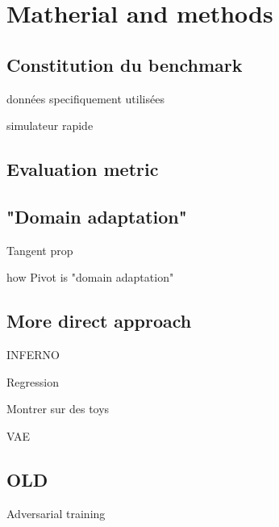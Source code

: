 
\chapter{Matherial and methods}
\label{chap:matherial_methods}
\ifpdf
    \graphicspath{{Chapter3/Figs/Raster/}{Chapter3/Figs/PDF/}{Chapter3/Figs/}}
\else
    \graphicspath{{Chapter3/Figs/Vector/}{Chapter3/Figs/}}
\fi


\section{Constitution du benchmark} %
\label{sec:constitution_du_benchmark}

données specifiquement utilisées

simulateur rapide

\section{Evaluation metric} %
\label{sec:evaluation_metric}


\section{"Domain adaptation"} %
\label{sec:domain_adaptation}

Tangent prop

how Pivot is "domain adaptation"



\section{More direct approach} %
\label{sec:more_direct_approach}

INFERNO

Regression

Montrer sur des toys

VAE

\section{OLD} %


Adversarial training

